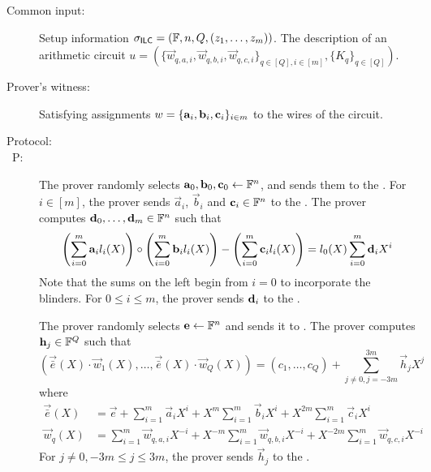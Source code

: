 \begin{description}\label{prot:3ac}
\item[Common input:] Setup information $\mathsf{\sigma}_{\mathsf{ILC}} = (\mathbb{F},n,Q,(z_1,\ldots,z_m))$. The description of an arithmetic circuit $u = \left( \{\vec{w}_{q,{a,i}},\vec{w}_{q,{b,i}},\vec{w}_{q,{c,i}}\}_{q \in [Q], i \in [m]}, \{K_{q}\}_{q \in [Q]}\right)$.
\item[Prover's witness:] Satisfying assignments $w = \{\mathbf{a}_i,\mathbf{b}_i,\mathbf{c}_i\}_{i \in m}$ to the wires of the circuit.
\item[Protocol:]
\item[\ P:]

The prover randomly selects $\mathbf{a}_{0},\mathbf{b}_{0},\mathbf{c}_{0}\gets \mathbb{F}^n$, and sends them to the \ILC. For $i \in [m]$, the prover sends $\vec{a}_{i}$, $\vec{b}_{i}$ and $\mathbf{c}_{i} \in \mathbb{F}^n$ to the \ILC. The prover computes $\mathbf{d}_0,\ldots,\mathbf{d}_m \in \mathbb{F}^n$ such that
\[
\left( \sum_{i=0}^m \mathbf{a}_{i} l_i(X) \right) \circ \left( \sum_{i=0}^m \mathbf{b}_{i} l_i(X) \right) - \left( \sum_{i=0}^m \mathbf{c}_{i} l_i(X) \right) = l_0(X) \sum_{i=0}^m \mathbf{d}_i X^i
\]
Note that the sums on the left begin from $i=0$ to incorporate the blinders. For $0 \leq i \leq m$, the prover sends $\mathbf{d}_i$ to the \ILC.

The prover randomly selects $\mathbf{e} \gets \mathbb{F}^n$ and sends it to \ILC. The prover computes $\mathbf{h}_j \in \mathbb{F}^Q$ such that
\[
(\vec{\bar{e}}(X)\cdot \vec{w}_1(X),\ldots,\vec{\bar{e}}(X)\cdot \vec{w}_Q(X)) = (c_1,\ldots,c_Q) + \sum_{j\neq 0,j=-3m}^{3m} \vec{h}_{j} X^j
\]
where
\begin{align*}
\vec{\bar{e}}(X) &= \vec{e} + \sum_{i=1}^m \vec{a}_{i} X^i + X^m \sum_{i=1}^m \vec{b}_{i} X^i + X^{2m} \sum_{i=1}^m \vec{c}_{i} X^i \\
\vec{w}_q(X) &= \sum_{i=1}^m \vec{w}_{q,a,i} X^{-i} + X^{-m} \sum_{i=1}^m \vec{w}_{q,b,i} X^{-i} + X^{-2m} \sum_{i=1}^m \vec{w}_{q,c,i} X^{-i}
\end{align*}
For $j\neq 0,-3m \leq j \leq 3m$, the prover sends $\vec{h}_j$ to the \ILC.


\end{description}
